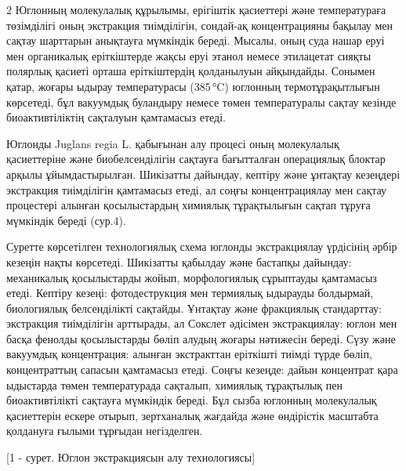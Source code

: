 \begin{multicols}{2}
Юглонның молекулалық құрылымы, ерігіштік қасиеттері және температураға
төзімділігі оның экстракция тиімділігін, сондай-ақ концентрацияны
бақылау мен сақтау шарттарын анықтауға мүмкіндік береді. Мысалы, оның
суда нашар еруі мен органикалық еріткіштерде жақсы еруі этанол немесе
этилацетат сияқты полярлық қасиеті орташа еріткіштердің қолданылуын
айқындайды. Сонымен қатар, жоғары ыдырау температурасы (385\,°C)
юглонның термотұрақытлығын көрсетеді, бұл вакуумдық буландыру немесе
төмен температуралы сақтау кезінде биоактивтіліктің сақталуын қамтамасыз
етеді.

Юглонды Juglans regia L. қабығынан алу процесі оның молекулалық
қасиеттеріне және биобелсенділігін сақтауға бағытталған операциялық
блоктар арқылы ұйымдастырылған. Шикізатты дайындау, кептіру және
ұнтақтау кезеңдері экстракция тиімділігін қамтамасыз етеді, ал соңғы
концентрациялау мен сақтау процестері алынған қосылыстардың химиялық
тұрақтылығын сақтап тұруға мүмкіндік береді (сур.4).

Суретте көрсетілген технологиялық схема юглонды экстракциялау үрдісінің
әрбір кезеңін нақты көрсетеді. Шикізатты қабылдау және бастапқы
дайындау: механикалық қосылыстарды жойып, морфологиялық сұрыптауды
қамтамасыз етеді. Кептіру кезеңі: фотодеструкция мен термиялық ыдырауды
болдырмай, биологиялық белсенділікті сақтайды. Ұнтақтау және фракциялық
стандарттау: экстракция тиімділігін арттырады, ал Сокслет әдісімен
экстракциялау: юглон мен басқа фенолды қосылыстарды бөліп алудың жоғары
нәтижесін береді. Сүзу және вакуумдық концентрация: алынған экстракттан
еріткішті тиімді түрде бөліп, концентраттың сапасын қамтамасыз етеді.
Соңғы кезеңде: дайын концентрат қара ыдыстарда төмен температурада
сақталып, химиялық тұрақтылық пен биоактивтілікті сақтауға мүмкіндік
береді. Бұл сызба юглонның молекулалық қасиеттерін ескере отырып,
зертханалық жағдайда және өндірістік масштабта қолдануға ғылыми тұрғыдан
негізделген.
\end{multicols}

[1 - сурет. Юглон экстракциясын алу технологиясы]

